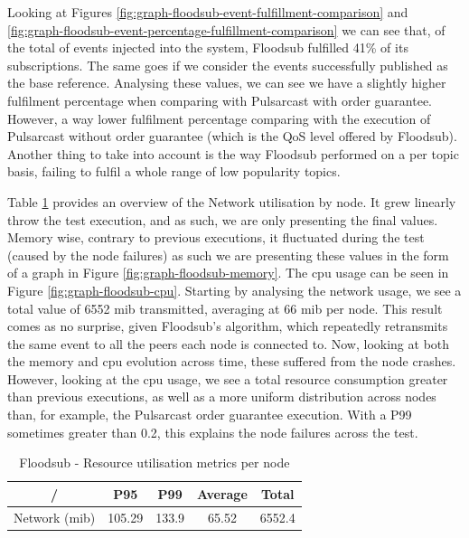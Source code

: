 Looking at Figures \ref{fig:graph-floodsub-event-fulfillment-comparison} and
\ref{fig:graph-floodsub-event-percentage-fulfillment-comparison} we can see
that, of the total of events injected into the system, Floodsub fulfilled 41\%
of its subscriptions. The same goes if we consider the events successfully
published as the base reference. Analysing these values, we can see we have a
slightly higher fulfilment percentage when comparing with Pulsarcast with order
guarantee. However, a way lower fulfilment percentage comparing with the
execution of Pulsarcast without order guarantee (which is the QoS level offered
by Floodsub). Another thing to take into account is the way Floodsub performed
on a per topic basis, failing to fulfil a  whole range of low popularity
topics.

Table \ref{table:floodsub} provides an overview of the Network utilisation by
node. It grew linearly throw the test execution, and as such, we are only
presenting the final values. Memory wise, contrary to previous executions, it
fluctuated during the test (caused by the node failures) as such we are
presenting these values in the form of a graph in Figure
\ref{fig:graph-floodsub-memory}. The \acrshort{cpu} usage can be seen in Figure
\ref{fig:graph-floodsub-cpu}. Starting by analysing the network usage, we see a
total value of 6552 \acrshort{mib} transmitted, averaging at 66 \acrshort{mib}
per node. This result comes as no surprise, given Floodsub's algorithm, which
repeatedly retransmits the same event to all the peers each node is connected
to. Now, looking at both the memory and \acrshort{cpu} evolution across time,
these suffered from the node crashes.  However, looking at the \acrshort{cpu}
usage, we see a total resource consumption greater than previous executions, as
well as a more uniform distribution across nodes than, for example, the
Pulsarcast order guarantee execution. With a P99 sometimes greater than 0.2,
this explains the node failures across the test.

\begin{table}[!htb]
\caption{Floodsub - Resource utilisation metrics per node}
\label{table:floodsub}
  \begin{center}
   \begin{tabular}{|c| c c c c|} 
   \hline
   / & P95 & P99 & Average & Total \\ [0.5ex] 
   \hline\hline
   Network (\acrshort{mib}) & 105.29 & 133.9 & 65.52 & 6552.4 \\
   \hline
  \end{tabular}
  \end{center}
\end{table}


